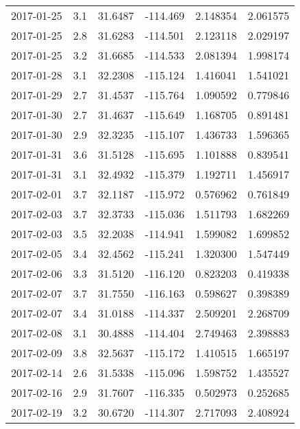 \begin{tabular}{lrrrrr}
2017-01-25 &       3.1 &  31.6487 &  -114.469 &         2.148354 &         2.061575 \\
2017-01-25 &       2.8 &  31.6283 &  -114.501 &         2.123118 &         2.029197 \\
2017-01-25 &       3.2 &  31.6685 &  -114.533 &         2.081394 &         1.998174 \\
2017-01-28 &       3.1 &  32.2308 &  -115.124 &         1.416041 &         1.541021 \\
2017-01-29 &       2.7 &  31.4537 &  -115.764 &         1.090592 &         0.779846 \\
2017-01-30 &       2.7 &  31.4637 &  -115.649 &         1.168705 &         0.891481 \\
2017-01-30 &       2.9 &  32.3235 &  -115.107 &         1.436733 &         1.596365 \\
2017-01-31 &       3.6 &  31.5128 &  -115.695 &         1.101888 &         0.839541 \\
2017-01-31 &       3.1 &  32.4932 &  -115.379 &         1.192711 &         1.456917 \\
2017-02-01 &       3.7 &  32.1187 &  -115.972 &         0.576962 &         0.761849 \\
2017-02-03 &       3.7 &  32.3733 &  -115.036 &         1.511793 &         1.682269 \\
2017-02-03 &       3.5 &  32.2038 &  -114.941 &         1.599082 &         1.699852 \\
2017-02-05 &       3.4 &  32.4562 &  -115.241 &         1.320300 &         1.547449 \\
2017-02-06 &       3.3 &  31.5120 &  -116.120 &         0.823203 &         0.419338 \\
2017-02-07 &       3.7 &  31.7550 &  -116.163 &         0.598627 &         0.398389 \\
2017-02-07 &       3.4 &  31.0188 &  -114.337 &         2.509201 &         2.268709 \\
2017-02-08 &       3.1 &  30.4888 &  -114.404 &         2.749463 &         2.398883 \\
2017-02-09 &       3.8 &  32.5637 &  -115.172 &         1.410515 &         1.665197 \\
2017-02-14 &       2.6 &  31.5338 &  -115.096 &         1.598752 &         1.435527 \\
2017-02-16 &       2.9 &  31.7607 &  -116.335 &         0.502973 &         0.252685 \\
2017-02-19 &       3.2 &  30.6720 &  -114.307 &         2.717093 &         2.408924 \\

\end{tabular}
